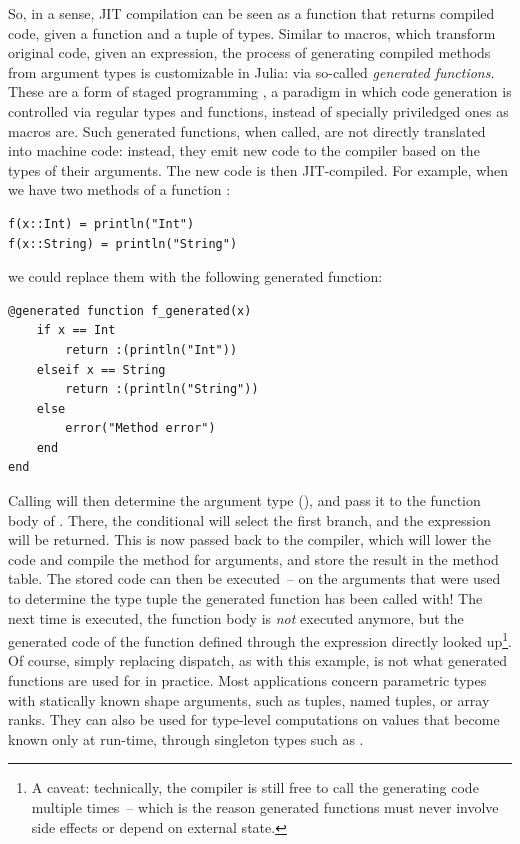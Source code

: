 So, in a sense, JIT compilation can be seen as a function that returns compiled code, given a
function and a tuple of types.  Similar to macros, which transform original code, given an
expression, the process of generating compiled methods from argument types is customizable in Julia:
via so-called \emph{generated functions}.  These are a form of staged programming
\parencite{rompf2010lightweight,bolewski2015staged}, a paradigm in which code generation is
controlled via regular types and functions, instead of specially priviledged ones as macros
are. Such generated functions, when called, are not directly translated into machine code: instead,
they emit new code to the compiler based on the types of their arguments.  The new code is then
JIT-compiled.  For example, when we have two methods of a function :
\begin{lstlisting}
f(x::Int) = println("Int")
f(x::String) = println("String")
\end{lstlisting}
we could replace them with the following generated function:
\begin{lstlisting}
@generated function f_generated(x)
    if x == Int
        return :(println("Int"))
    elseif x == String
        return :(println("String"))
    else
        error("Method error")
    end
end
\end{lstlisting}
Calling  will then determine the argument type (), and
pass it to the function body of .  There, the conditional will select the first
branch, and the expression  will be returned.  This is now passed back to
the compiler, which will lower the code and compile the method for  arguments, and store
the result in the method table.  The stored code can then be executed~-- on the arguments that were
used to determine the type tuple the generated function has been called with!  The next time
 is executed, the function body is \emph{not} executed anymore, but the generated
code of the function defined through the expression  directly looked
up\footnote{A caveat: technically, the compiler is still free to call the generating code multiple
  times~-- which is the reason generated functions must never involve side effects or depend on
  external state.}.  Of course, simply replacing dispatch, as with this example, is not what
generated functions are used for in practice.  Most applications concern parametric types with
statically known shape arguments, such as tuples, named tuples, or array ranks.  They can also be
used for type-level computations on values that become known only at run-time, through singleton
types such as .

